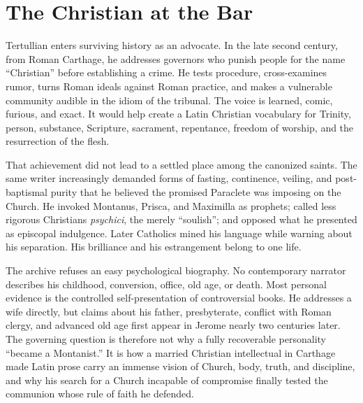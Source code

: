 \section{The Christian at the Bar}

Tertullian enters surviving history as an advocate. In the late second century,
from Roman Carthage, he addresses governors who punish people for the name
``Christian'' before establishing a crime. He tests procedure, cross-examines
rumor, turns Roman ideals against Roman practice, and makes a vulnerable
community audible in the idiom of the tribunal. The voice is learned, comic,
furious, and exact. It would help create a Latin Christian vocabulary for
Trinity, person, substance, Scripture, sacrament, repentance, freedom of
worship, and the resurrection of the flesh.

That achievement did not lead to a settled place among the canonized saints.
The same writer increasingly demanded forms of fasting, continence, veiling,
and post-baptismal purity that he believed the promised Paraclete was imposing
on the Church. He invoked Montanus, Prisca, and Maximilla as prophets; called
less rigorous Christians \emph{psychici}, the merely ``soulish''; and opposed
what he presented as episcopal indulgence. Later Catholics mined his language
while warning about his separation. His brilliance and his estrangement belong
to one life.

The archive refuses an easy psychological biography. No contemporary narrator
describes his childhood, conversion, office, old age, or death. Most personal
evidence is the controlled self-presentation of controversial books. He
addresses a wife directly, but claims about his father, presbyterate, conflict
with Roman clergy, and advanced old age first appear in Jerome nearly two
centuries later. The governing question is therefore not why a fully
recoverable personality ``became a Montanist.'' It is how a married Christian
intellectual in Carthage made Latin prose carry an immense vision of Church,
body, truth, and discipline, and why his search for a Church incapable of
compromise finally tested the communion whose rule of faith he defended.
